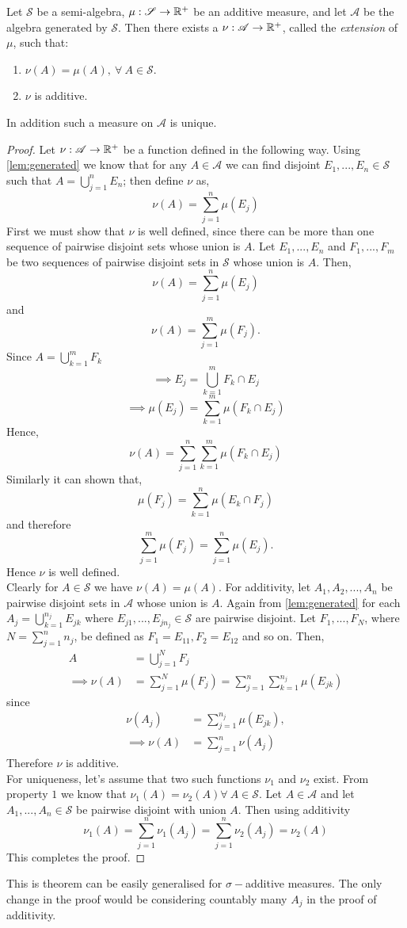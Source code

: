 \begin{theorem}\label{thm:extension}
  Let $ \mathscr{S}$ be a semi-algebra, $\mu: \mathscr{S}\to \mathbb{R}^+$ be an additive measure, and let $ \mathscr{A}$ be the algebra generated by $ \mathscr{S}$. Then there exists a $\nu: \mathscr{A}\to \mathbb{R}^+$, called the \textit{extension} of $\mu$, such that:
  \begin{enumerate}
    \item $\nu(A) = \mu(A),\ \forall\ A\in \mathscr{S}$.
    \item $\nu$ is additive.
  \end{enumerate}
  In addition such a measure on $ \mathscr{A}$ is unique.  
\end{theorem}
\begin{proof}
  Let $\nu: \mathscr{A}\to \mathbb{R}^+$ be a function defined in the following way. Using \cref{lem:generated} we know that for any $A\in \mathscr{A}$ we can find disjoint $E_1,...,E_n\in \mathscr{S}$ such that $A = \bigcup_{j=1}^n E_n$; then define $\nu$ as,
  \[\nu(A) = \sum_{j=1}^n\mu(E_j)\]
  First we must show that $\nu$ is well defined, since there can be more than one sequence of pairwise disjoint sets whose union is $A$. Let $E_1,...,E_n$ and $F_1,...,F_m$ be two sequences of pairwise disjoint sets in $ \mathscr{S}$ whose union is $A$. Then, 
  \[\nu(A) = \sum_{j=1}^n\mu(E_j) \]
  and
  \[\nu(A) = \sum_{j=1}^m\mu(F_j). \]
  Since $A = \bigcup_{k=1}^m F_k$
  \[\implies E_j = \bigcup_{k=1}^m F_k\cap E_j\]
  \[\implies \mu(E_j) = \sum_{k=1}^m \mu(F_k \cap E_j)\]
  Hence,
  \[\nu(A) =\sum_{j=1}^n\sum_{k=1}^m \mu(F_k \cap E_j) \]
  Similarly it can shown that,
  \[\mu(F_j) = \sum_{k=1}^n \mu(E_k \cap F_j)\]
  and therefore
  \[\sum_{j=1}^m\mu(F_j) =\sum_{j=1}^n\mu(E_j). \]
  Hence $\nu$ is well defined. \\

  Clearly for $A\in \mathscr{S}$ we have $\nu(A) = \mu(A)$. For additivity, let $A_1, A_2,...,A_n$ be pairwise disjoint sets in $ \mathscr{A}$ whose union is $A$. Again from \cref{lem:generated} for each $A_j = \bigcup_{k=1}^{n_j}E_{jk}$ where $E_{j1},...,E_{jn_j} \in \mathscr{S}$ are pairwise disjoint. Let $F_1,...,F_{N}$, where $N=\sum_{j=1}^n n_j$, be defined as $F_1 = E_{11}, F_2 = E_{12}$ and so on. Then,
  \begin{align*}
    A &= \bigcup_{j=1}^N F_j\\
    \implies \nu(A) &= \sum_{j=1}^{N} \mu(F_j) = \sum_{j=1}^{n}\sum_{k=1}^{n_j} \mu(E_{jk})
  \end{align*}
  since
  \begin{align*}
    \nu(A_j) &= \sum_{j=1}^{n_j} \mu(E_{jk}),\\
    \implies \nu(A) &= \sum_{j=1}^n \nu(A_j)
  \end{align*}
  Therefore $\nu$ is additive.\\

  For uniqueness, let's assume that two such functions $\nu_1$ and $\nu_2$ exist. From property $1$ we know that $\nu_1(A) = \nu_2(A) \forall\ A\in \mathscr{S}$. Let $A\in \mathscr{A}$ and let $A_1,...,A_n\in \mathscr{S}$ be pairwise disjoint with union $A$. Then using additivity 
  \[\nu_1(A) = \sum_{j=1}^n\nu_1(A_j) = \sum_{j=1}^n\nu_2(A_j) = \nu_2(A)\]
  This completes the proof.
\end{proof}
\begin{remark}
  This is theorem can be easily generalised for $\sigma-$additive measures. The only change in the proof would be considering countably many $A_j$ in the proof of additivity.
\end{remark}
